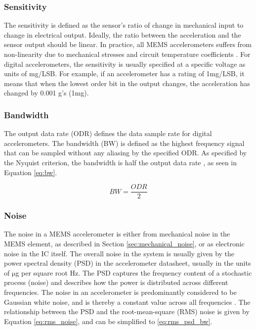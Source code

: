 \subsubsection{Sensitivity}
The sensitivity is defined as the sensor's ratio of change in mechanical input to change in electrical output. Ideally, the ratio between the acceleration and the sensor output should be linear. In practice, all MEMS accelerometers suffers from non-linearity due to mechanical stresses and circuit temperature coefficients  \cite{analog_accel_guide}. For digital accelerometers, the sensitivity is usually specified at a specific voltage as units of mg/LSB. For example, if an accelerometer has a rating of 1mg/LSB, it means that when the lowest order bit in the output changes, the acceleration has changed by 0.001 g's (1mg).

\subsubsection{Bandwidth}

The output data rate (ODR) defines the data sample rate for digital accelerometers. The bandwidth (BW) is defined as the highest frequency signal that can be sampled without any aliasing by the specified ODR. As specified by the Nyquist criterion, the bandwidth is half the output data rate \cite{analog_accel_guide}, as seen in Equation \ref{eq:bw}. 

\begin{equation}
BW = \frac{ODR}{2}
\label{eq:bw}
\end{equation}

\subsubsection{Noise}

The noise in a MEMS accelerometer is either from mechanical noise in the MEMS element, as described in Section \ref{sec:mechanical_noise}, or as electronic noise in the IC itself. The overall noise in the system is usually given by the power spectral density (PSD) in the accelerometer datasheet, usually in the units of $\si{\micro}$g per square root Hz. The PSD captures the frequency content of a stochastic process (noise) and describes how the power is distributed across different frequencies. The noise in an accelerometer is predominantly considered to be Gaussian white noise, and is thereby a constant value across all frequencies \cite{freescale_accel_guide}. The relationship between the PSD and the root-mean-square (RMS) noise is given by Equation \ref{eq:rms_noise}, and can be simplified to \ref{eq:rms_psd_bw}.

